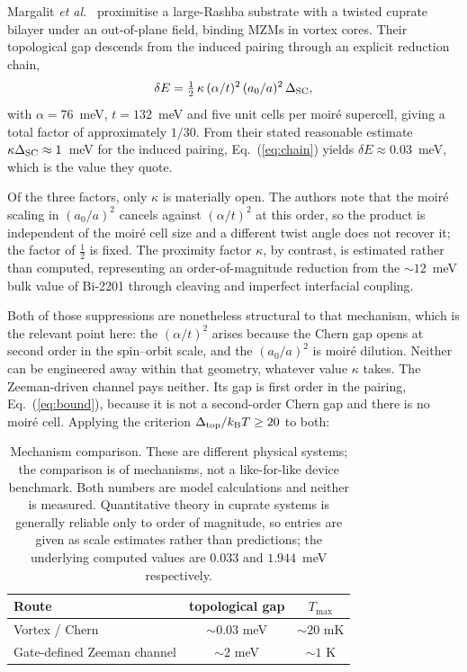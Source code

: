 \documentclass[aps,prb,twocolumn,superscriptaddress,floatfix,nofootinbib]{revtex4-2}
\newcommand{\dtop}{\Delta_{\rm top}}
\newcommand{\kB}{k_{\rm B}}
\begin{document}
Margalit \emph{et al.}~\cite{Margalit2022} proximitise a large-Rashba
substrate with a twisted cuprate bilayer under an out-of-plane field, binding
MZMs in vortex cores. Their topological gap descends from the induced pairing
through an explicit reduction chain,
%
\begin{equation}
\delta E = \tfrac{1}{2}\, \kappa \, (\alpha/t)^2 \, (a_0/a)^2 \, \Delta_{\rm SC} ,
\label{eq:chain}
\end{equation}
%
with $\alpha = 76$~meV, $t = 132$~meV and five unit cells per moir\'e
supercell, giving a total factor of approximately $1/30$. From their stated
reasonable estimate $\kappa\Delta_{\rm SC}\approx 1$~meV for the induced
pairing, Eq.~(\ref{eq:chain}) yields $\delta E \approx 0.03$~meV, which is the
value they quote.

Of the three factors, only $\kappa$ is materially open. The authors note that
the moir\'e scaling in $(a_0/a)^2$ cancels against $(\alpha/t)^2$ at this
order, so the product is independent of the moir\'e cell size and a different
twist angle does not recover it; the factor of $\tfrac{1}{2}$ is fixed. The
proximity factor $\kappa$, by contrast, is estimated rather than computed,
representing an order-of-magnitude reduction from the $\sim12$~meV bulk value
of Bi-2201 through cleaving and imperfect interfacial coupling.

Both of those suppressions are nonetheless structural to that mechanism, which
is the relevant point here: the $(\alpha/t)^2$ arises because the Chern gap
opens at second order in the spin--orbit scale, and the $(a_0/a)^2$ is moir\'e
dilution. Neither can be engineered away within that geometry, whatever value
$\kappa$ takes. The Zeeman-driven channel pays neither. Its
gap is first order in the pairing, Eq.~(\ref{eq:bound}), because it is not a
second-order Chern gap and there is no moir\'e cell. Applying the criterion
$\dtop/\kB T \ge 20$ to both:

\begin{table}[h]
\caption{Mechanism comparison. These are different physical systems; the
comparison is of mechanisms, not a like-for-like device benchmark. Both
numbers are model calculations and neither is measured. Quantitative theory in
cuprate systems is generally reliable only to order of magnitude, so entries
are given as scale estimates rather than predictions; the underlying computed
values are $0.033$ and $1.944$~meV respectively.}
\label{tab:mechanism}
\begin{ruledtabular}
\begin{tabular}{lcc}
Route & topological gap & $T_{\max}$ \\
\hline
Vortex / Chern~\cite{Margalit2022} & $\sim\!0.03$ meV & $\sim\!20$ mK \\
Gate-defined Zeeman channel & $\sim\!2$ meV & $\sim\!1$ K \\
\end{tabular}
\end{ruledtabular}
\end{table}
\end{document}
